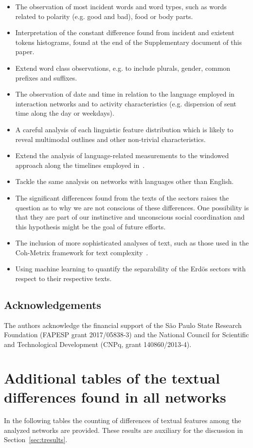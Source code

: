 \documentclass[review]{elsarticle}
\begin{document}
\begin{itemize}
\item The observation of most incident words and word types,
  such as words related to polarity (e.g. good and bad), food or body parts.
\item Interpretation of the constant difference found from incident and existent tokens histograms, found at the end of the Supplementary document of this paper.
\item Extend word class observations, e.g. to include plurals, gender, common prefixes and suffixes.
\item The observation of date and time in relation to the language employed in interaction networks and
to activity characteristics (e.g. dispersion of sent time along the day or weekdays).
\item A careful analysis of each linguistic feature distribution which is likely to reveal multimodal outlines and other non-trivial characteristics.
\item Extend the analysis of language-related measurements to the windowed approach along the timelines employed in~\cite{stab}.
\item Tackle the same analysis on networks with languages other than English.
\item The significant differences found from the texts of the sectors raises the question as to why we are not conscious of these differences.
One possibility is that they are part of our instinctive and unconscious social coordination and this hypothesis might be the goal of future efforts.
\item The inclusion of more sophisticated analyses of text, such as those used in the Coh-Metrix framework for text complexity~\cite{coh}.
\item Using machine learning to quantify the separability of the Erdös sectors with respect to their respective texts.
\end{itemize}

\subsection*{Acknowledgements}
The authors acknowledge the financial support of the São Paulo State Research Foundation (FAPESP grant 2017/05838-3) and the National Council for Scientific and Technological Development (CNPq, grant 140860/2013-4).

\appendix
\section{Additional tables of the textual differences found in all networks}\label{ap:textd}
In the following tables the counting of differences of textual features among the analyzed networks
are provided.
	These results are auxiliary for the discussion in Section~\ref{sec:tresults}.
\FloatBarrier










\end{document}
